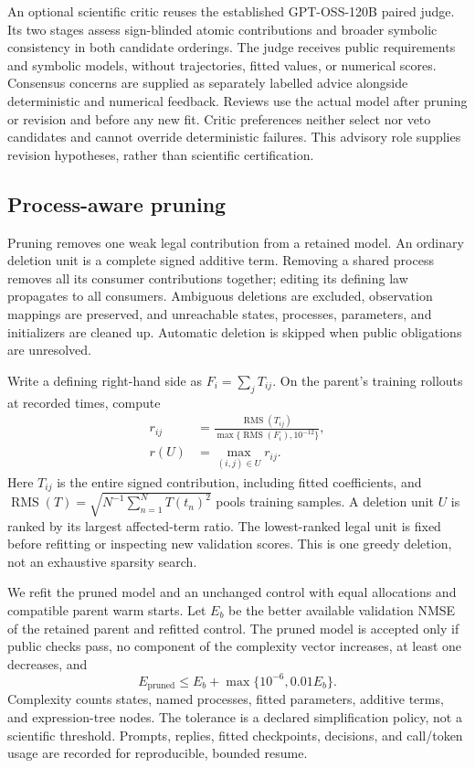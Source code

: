 An optional scientific critic reuses the established GPT-OSS-120B paired judge.
Its two stages assess sign-blinded atomic contributions and broader symbolic
consistency in both candidate orderings. The judge receives public requirements
and symbolic models, without trajectories, fitted values, or numerical scores.
Consensus concerns are supplied as separately labelled advice alongside
deterministic and numerical feedback. Reviews use the actual model after pruning
or revision and before any new fit. Critic preferences neither select nor veto
candidates and cannot override deterministic failures. This advisory role supplies
revision hypotheses, rather than scientific certification.

\subsection{Process-aware pruning}
\label{sec:af-pruning}

Pruning removes one weak legal contribution from a retained model. An ordinary
deletion unit is a complete signed additive term. Removing a shared process
removes all its consumer contributions together; editing its defining law
propagates to all consumers. Ambiguous deletions are excluded, observation
mappings are preserved, and unreachable states, processes, parameters, and
initializers are cleaned up. Automatic deletion is skipped when public obligations
are unresolved.

Write a defining right-hand side as $F_i=\sum_jT_{ij}$. On the parent's training
rollouts at recorded times, compute
\begin{equation}
 \begin{aligned}
 r_{ij}&=\frac{\operatorname{RMS}(T_{ij})}
                  {\max\{\operatorname{RMS}(F_i),10^{-12}\}},\\
 r(U)&=\max_{(i,j)\in U}r_{ij}.
 \end{aligned}
 \label{eq:af-pruning-rank}
\end{equation}
Here $T_{ij}$ is the entire signed contribution, including fitted coefficients,
and $\operatorname{RMS}(T)=\sqrt{N^{-1}\sum_{n=1}^N T(t_n)^2}$ pools training
samples. A deletion unit $U$ is ranked by its largest affected-term ratio. The
lowest-ranked legal unit is fixed before refitting or inspecting new validation
scores. This is one greedy deletion, not an exhaustive sparsity search.

We refit the pruned model and an unchanged control with equal allocations and
compatible parent warm starts. Let $E_b$ be the better available validation NMSE
of the retained parent and refitted control. The pruned model is accepted only
if public checks pass, no component of the complexity vector increases, at least
one decreases, and
\begin{equation}
 E_{\mathrm{pruned}}\leq E_b+\max\{10^{-6},0.01E_b\}.
 \label{eq:af-pruning-accept}
\end{equation}
Complexity counts states, named processes, fitted parameters, additive terms,
and expression-tree nodes. The tolerance is a declared simplification policy,
not a scientific threshold. Prompts, replies, fitted checkpoints, decisions,
and call/token usage are recorded for reproducible, bounded resume.
